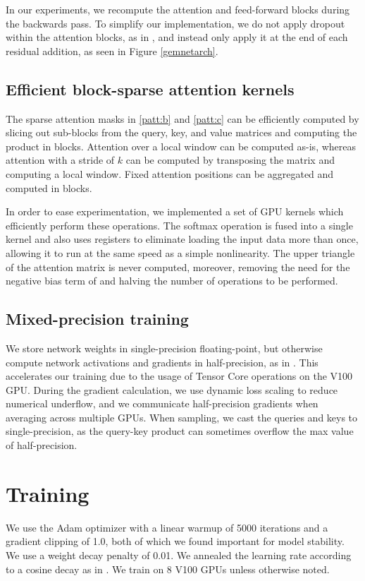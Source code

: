 \documentclass{article}
\begin{document}
In our experiments, we recompute the attention and feed-forward blocks during the backwards pass. To simplify our implementation, we do not apply dropout within the attention blocks, as in \cite{vaswani2017attention}, and instead only apply it at the end of each residual addition, as seen in Figure \ref{gemnetarch}.

\subsection{Efficient block-sparse attention kernels}
The sparse attention masks in \ref{patt:b} and \ref{patt:c} can be efficiently computed by slicing out sub-blocks from the query, key, and value matrices and computing the product in blocks. Attention over a local window can be computed as-is, whereas attention with a stride of $k$ can be computed by transposing the matrix and computing a local window. Fixed attention positions can be aggregated and computed in blocks.

In order to ease experimentation, we implemented a set of GPU kernels which efficiently perform these operations. The softmax operation is fused into a single kernel and also uses registers to eliminate loading the input data more than once, allowing it to run at the same speed as a simple nonlinearity. The upper triangle of the attention matrix is never computed, moreover, removing the need for the negative bias term of \cite{vaswani2017attention} and halving the number of operations to be performed.

\subsection{Mixed-precision training}
We store network weights in single-precision floating-point, but otherwise compute network activations and gradients in half-precision, as in \cite{micikevicius2017mixed}. This accelerates our training due to the usage of Tensor Core operations on the V100 GPU. During the gradient calculation, we use dynamic loss scaling to reduce numerical underflow, and we communicate half-precision gradients when averaging across multiple GPUs. When sampling, we cast the queries and keys to single-precision, as the query-key product can sometimes overflow the max value of half-precision.


\section{Training}
We use the Adam optimizer with a linear warmup of 5000 iterations and a gradient clipping of 1.0, both of which we found important for model stability. We use a weight decay penalty of 0.01. We annealed the learning rate according to a cosine decay as in \cite{radford2018}. We train on 8 V100 GPUs unless otherwise noted.
\end{document}
